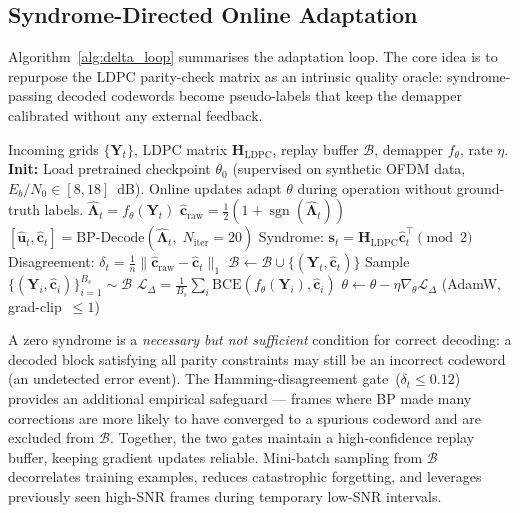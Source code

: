 \documentclass{ieeeaccess}
\begin{document}
\subsection{Syndrome-Directed Online Adaptation}

Algorithm~\ref{alg:delta_loop} summarises the adaptation loop. The core idea is to
repurpose the LDPC parity-check matrix as an intrinsic quality oracle: syndrome-passing
decoded codewords become pseudo-labels that keep the demapper calibrated without any
external feedback.

\begin{algorithm}[!t]
\caption{Self-Supervised $\Delta$-Gradient Adaptation}
\label{alg:delta_loop}
\small
\begin{algorithmic}[1]
\REQUIRE Incoming grids $\{\mathbf{Y}_t\}$, LDPC matrix $\mathbf{H}_{\text{LDPC}}$,
         replay buffer $\mathcal{B}$, demapper $f_\theta$, rate $\eta$.
\STATE \textbf{Init:} Load pretrained checkpoint $\theta_0$ (supervised on
  synthetic OFDM data, $E_b/N_0\in[8,18]$~dB). Online updates adapt $\theta$
  during operation without ground-truth labels.
  \STATE $\hat{\bm{\Lambda}}_t = f_\theta(\mathbf{Y}_t)$
  \STATE $\hat{\mathbf{c}}_{\text{raw}} = \tfrac{1}{2}(1+\operatorname{sgn}(\hat{\bm{\Lambda}}_t))$
  \STATE $[\hat{\mathbf{u}}_t,\hat{\mathbf{c}}_t] = \text{BP-Decode}(\hat{\bm{\Lambda}}_t,\;N_{\text{iter}}\!=\!20)$
  \STATE Syndrome: $\mathbf{s}_t = \mathbf{H}_{\text{LDPC}}\hat{\mathbf{c}}_t^{\top}\!\pmod{2}$
  \STATE Disagreement: $\delta_t = \frac{1}{n}\|\hat{\mathbf{c}}_{\text{raw}}-\hat{\mathbf{c}}_t\|_1$
    \STATE $\mathcal{B}\leftarrow\mathcal{B}\cup\{(\mathbf{Y}_t,\hat{\mathbf{c}}_t)\}$
  \ENDIF
    \STATE Sample $\{(\mathbf{Y}_i,\hat{\mathbf{c}}_i)\}_{i=1}^{B_s}\!\sim\!\mathcal{B}$
    \STATE $\mathcal{L}_\Delta = \frac{1}{B_s}\sum_{i}\mathrm{BCE}(f_\theta(\mathbf{Y}_i),\hat{\mathbf{c}}_i)$
    \STATE $\theta\leftarrow\theta - \eta\nabla_\theta\mathcal{L}_\Delta$ \quad(AdamW, grad-clip~$\le 1$)
  \ENDIF
\ENDFOR
\end{algorithmic}
\end{algorithm}

A zero syndrome is a \emph{necessary but not sufficient} condition for correct decoding:
a decoded block satisfying all parity constraints may still be an incorrect codeword
(an undetected error event). The Hamming-disagreement gate~($\delta_t\le0.12$) provides
an additional empirical safeguard --- frames where BP made many corrections are more
likely to have converged to a spurious codeword and are excluded from $\mathcal{B}$.
Together, the two gates maintain a high-confidence replay buffer, keeping gradient
updates reliable. Mini-batch sampling from $\mathcal{B}$ decorrelates training examples,
reduces catastrophic forgetting, and leverages previously seen high-SNR frames during
temporary low-SNR intervals.
\end{document}
